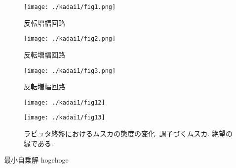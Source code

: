 \begin{figure}
    \centering
    \texttt{[image: ./kadai1/fig1.png]}
    \caption{反転増幅回路}
    \label{fig1}

    \texttt{[image: ./kadai1/fig2.png]}
    \caption{反転増幅回路}
    \label{fig2}

    \texttt{[image: ./kadai1/fig3.png]}
    \caption{反転増幅回路}
    \label{fig3}
\end{figure}


\begin{figure}[htb]
    \begin{minipage}[b]{0.45\linewidth}
        \centering
        \texttt{[image: ./kadai1/fig12]}
        \label{l1}
    \end{minipage}
    \begin{minipage}[b]{0.45\linewidth}
        \centering
        \texttt{[image: ./kadai1/fig13]}
        \label{l2}
    \end{minipage}
    \caption{
        ラピュタ終盤におけるムスカの態度の変化.
        調子づくムスカ.
        絶望の縁である.
    }
    \label{musuka}
\end{figure}


\begin{itembox}[l]{最小自乗解}
    hogehoge
\end{itembox}

\renewcommand{\bibname}{参考文献}



